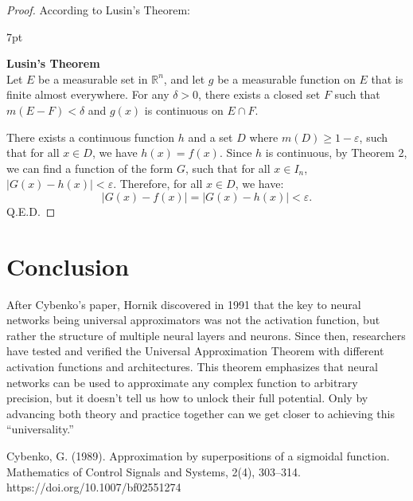 \documentclass[12pt]{article}
\newenvironment{formal}{%
\def\FrameCommand{%
\hspace{1pt}%
{\color{Blue}\vrule width 2pt}%
{\color{formalshade}\vrule width 4pt}%
\colorbox{formalshade}%
}%
\MakeFramed{\advance\hsize-\width\FrameRestore}%
\noindent\hspace{-4.55pt}%
\begin{adjustwidth}{}{7pt}%
\vspace{2pt}\vspace{2pt}%
}
{%
\vspace{2pt}\end{adjustwidth}\endMakeFramed%
}
\begin{document}
\begin{proof}
    According to Lusin's Theorem:
    \begin{formal}
        \textbf{Lusin's Theorem}\\
        Let $E$ be a measurable set in $\mathbb{R}^n$, and let $g$ be a measurable function on $E$ that is finite almost everywhere. For any \( \delta > 0 \), there exists a closed set $F$ such that $m(E - F) < \delta$ and $g(x)$ is continuous on $E \cap F$.
    \end{formal}
    There exists a continuous function $h$ and a set $D$ where $m(D) \geq 1 - \varepsilon$, such that for all $x \in D$, we have $h(x) = f(x)$. Since $h$ is continuous, by Theorem 2, we can find a function of the form $G$, such that for all $x \in I_n$, $|G(x) - h(x)| < \varepsilon$. Therefore, for all $x \in D$, we have:
    $$
    |G(x) - f(x)| = |G(x) - h(x)| < \varepsilon.
    $$
    Q.E.D.
    \end{proof}

\section{Conclusion}
After Cybenko’s paper, Hornik discovered in 1991 that the key to neural networks being universal approximators was not the activation function, but rather the structure of multiple neural layers and neurons. Since then, researchers have tested and verified the Universal Approximation Theorem with different activation functions and architectures. This theorem emphasizes that neural networks can be used to approximate any complex function to arbitrary precision, but it doesn’t tell us how to unlock their full potential. Only by advancing both theory and practice together can we get closer to achieving this “universality.”

\begin{thebibliography}{99}
     Cybenko, G. (1989). Approximation by superpositions of a sigmoidal function. Mathematics of Control Signals and Systems, 2(4), 303–314. https://doi.org/10.1007/bf02551274
\end{thebibliography}
\end{document}
